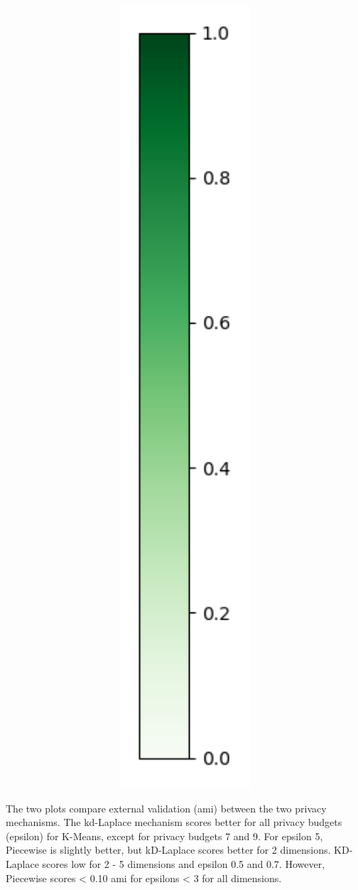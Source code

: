 \begin{figure}[H]
\begin{subfigure}[b]{0.075\textwidth}
    \includegraphics[width=1\textwidth]{Results/kd-laplace/kd-Laplace/seeds-dataset/heatmap_legend.png}
  \end{subfigure}
\end{figure}
The two plots compare external validation (\gls{ami}) between the two privacy mechanisms.
The kd-Laplace mechanism scores better for all privacy budgets (epsilon) for K-Means, except for privacy budgets 7 and 9.
For epsilon 5, Piecewise is slightly better, but kD-Laplace scores better for 2 dimensions.
KD-Laplace scores low for 2 - 5 dimensions and epsilon 0.5 and 0.7.
However, Piecewise scores < 0.10 \gls{ami} for epsilons < 3 for all dimensions.
\newpage
